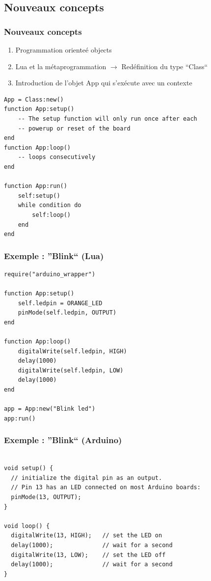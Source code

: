 \documentclass{beamer}
\begin{document}
\subsection{Nouveaux concepts}
\begin{frame}[containsverbatim]
\frametitle{Nouveaux concepts}
\begin{enumerate}
 \item Programmation orienteé objects
 \item Lua et la métaprogrammation $\to$ Redéfinition du type ``Class``
 \item Introduction de l'objet App qui s'exécute avec un contexte
\end{enumerate}

\scriptsize{\begin{lstlisting}
App = Class:new()
function App:setup()
    -- The setup function will only run once after each
    -- powerup or reset of the board
end
function App:loop()
    -- loops consecutively
end

function App:run()
    self:setup()
    while condition do
        self:loop()
    end
end
\end{lstlisting}}

\end{frame}

\begin{frame}[containsverbatim]
\frametitle{Exemple : ''Blink`` (Lua)}
\tiny{\begin{lstlisting}
require("arduino_wrapper")

function App:setup()
    self.ledpin = ORANGE_LED
    pinMode(self.ledpin, OUTPUT)
end

function App:loop()
    digitalWrite(self.ledpin, HIGH)
    delay(1000)
    digitalWrite(self.ledpin, LOW)
    delay(1000)
end

app = App:new("Blink led")
app:run()
\end{lstlisting}}
\end{frame}

\begin{frame}[containsverbatim]
\frametitle{Exemple : ''Blink`` (Arduino)}
\tiny{\begin{lstlisting}

void setup() {
  // initialize the digital pin as an output.
  // Pin 13 has an LED connected on most Arduino boards:
  pinMode(13, OUTPUT);
}

void loop() {
  digitalWrite(13, HIGH);   // set the LED on
  delay(1000);              // wait for a second
  digitalWrite(13, LOW);    // set the LED off
  delay(1000);              // wait for a second
}
\end{lstlisting}}
\end{frame}
\end{document}
